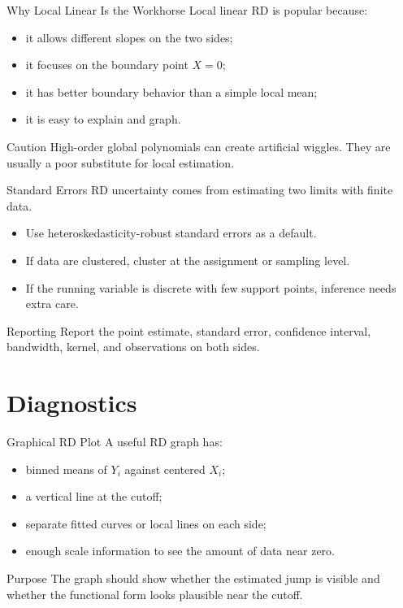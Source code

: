 \documentclass[11pt,aspectratio=169]{beamer}
\begin{document}
\begin{frame}{Why Local Linear Is the Workhorse}
  Local linear RD is popular because:
  \begin{itemize}
    \item it allows different slopes on the two sides;
    \item it focuses on the boundary point \(X=0\);
    \item it has better boundary behavior than a simple local mean;
    \item it is easy to explain and graph.
  \end{itemize}
  \begin{block}{Caution}
    High-order global polynomials can create artificial wiggles. They are usually a poor substitute for local estimation.
  \end{block}
\end{frame}

\begin{frame}{Standard Errors}
  RD uncertainty comes from estimating two limits with finite data.
  \begin{itemize}
    \item Use heteroskedasticity-robust standard errors as a default.
    \item If data are clustered, cluster at the assignment or sampling level.
    \item If the running variable is discrete with few support points, inference needs extra care.
  \end{itemize}
  \begin{block}{Reporting}
    Report the point estimate, standard error, confidence interval, bandwidth, kernel, and observations on both sides.
  \end{block}
\end{frame}

\section{Diagnostics}

\begin{frame}{Graphical RD Plot}
  A useful RD graph has:
  \begin{itemize}
    \item binned means of \(Y_i\) against centered \(X_i\);
    \item a vertical line at the cutoff;
    \item separate fitted curves or local lines on each side;
    \item enough scale information to see the amount of data near zero.
  \end{itemize}
  \begin{block}{Purpose}
    The graph should show whether the estimated jump is visible and whether the functional form looks plausible near the cutoff.
  \end{block}
\end{frame}
\end{document}
